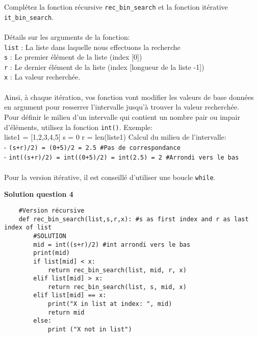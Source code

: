 \begin{Exercice}[15 minutes]
    \begin{conseil}
        Complétez la fonction récursive \lstinline{rec_bin_search} et la fonction itérative \lstinline{it_bin_search}.\\\\
        Détails sur les arguments de la fonction:\\
        \lstinline{list} : La liste dans laquelle nous effectuons la recherche\\
        \lstinline{s} : Le premier élément de la liste (index [0])\\
        \lstinline{r} : Le dernier élément de la liste (index [longueur de la liste -1])\\
        \lstinline{x} : La valeur recherchée.\\\\

        Ainsi, à chaque itération, vos fonction vont modifier les valeurs de base données en argument pour resserrer l'intervalle jusqu'à trouver la valeur recherchée.\\        
        Pour définir le milieu d'un intervalle qui contient un nombre pair ou impair d'éléments, utilisez la fonction \lstinline{int()}. Exemple:\\
        liste1 = [1,2,3,4,5]
        s = 0 \quad r = len(liste1)
        Calcul du milieu de l'intervalle:\\
        - \lstinline{(s+r)/2) = (0+5)/2 = 2.5 #Pas de correspondance}\\
        - \lstinline{int((s+r)/2) = int((0+5)/2) = int(2.5) = 2 #Arrondi vers le bas}\\\\
        
        Pour la version itérative, il est conseillé d'utiliser une boucle \lstinline{while}.

    \end{conseil}

    \textbf{Solution question 4}

    \begin{verbatim}
    #Version récursive
    def rec_bin_search(list,s,r,x): #s as first index and r as last index of list
        #SOLUTION
        mid = int((s+r)/2) #int arrondi vers le bas
        print(mid)
        if list[mid] < x:
            return rec_bin_search(list, mid, r, x) 
        elif list[mid] > x:
            return rec_bin_search(list, s, mid, x)
        elif list[mid] == x:
            print("X in list at index: ", mid)
            return mid 
        else:
            print ("X not in list")
            

\end{verbatim}
\end{Exercice}
